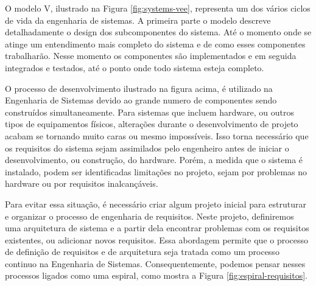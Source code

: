     O modelo V, ilustrado na Figura \ref{fig:systems-vee}, representa um dos vários ciclos de vida da engenharia de sistemas. A primeira parte o modelo descreve detalhadamente o design dos subcomponentes do sistema. Até o momento onde se atinge um entendimento mais completo do sistema e de como esses componentes trabalharão. Nesse momento os componentes são implementados e em seguida integrados e testados, até o ponto onde todo sistema esteja completo.
    
    \begin{figure}[h!]
        \centering
    \end{figure}
    
    O processo de desenvolvimento ilustrado na figura acima, é utilizado na Engenharia de Sistemas devido ao grande numero de componentes sendo construídos simultaneamente. Para sistemas que incluem hardware, ou outros tipos de equipamentos físicos, alterações durante o desenvolvimento de projeto acabam se tornando muito caras ou mesmo impossíveis. Isso torna necessário que os requisitos do sistema sejam assimilados pelo engenheiro antes de iniciar o desenvolvimento, ou construção, do hardware. Porém, a medida que o sistema é instalado,  podem ser identificadas limitações no projeto, sejam por problemas no hardware ou por requisitos inalcançáveis. 

    Para evitar essa situação, é necessário criar algum projeto inicial para estruturar e organizar o processo de engenharia de requisitos. Neste projeto, definiremos uma arquitetura de sistema e a partir dela encontrar problemas com os requisitos existentes, ou adicionar novos requisitos. Essa abordagem permite que o processo de definição de requisitos e de arquitetura seja tratada como um processo continuo na Engenharia de Sistemas. Consequentemente, podemos pensar nesses processos ligados como uma espiral, como mostra a Figura \ref{fig:espiral-requisitos}.
    
